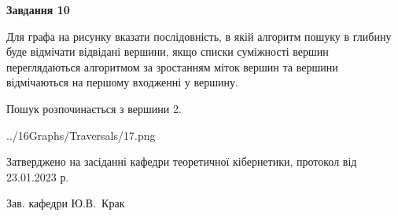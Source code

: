 \documentclass[12pt, ukrainian]{article}
\begin{document}
{\begin {large}
{\begin {center}\textbf{Завдання 10}\end {center}}\par
Для графа на рисунку вказати послідовність, в якій алгоритм пошуку в глибину буде відмічати відвідані вершини, якщо списки суміжності вершин переглядаються алгоритмом за зростанням міток вершин та вершини відмічаються на першому вход\-женні у вершину.\par
Пошук розпочинається з вершини 2.\par

\begin{center}
	{../16Graphs/Traversals/17.png}
\end{center}\par
\newpage


\end {large}
}
{\smallskip \begin {small} Затверджено на засіданні кафедри теоретичної кібернетики, протокол  від   23.01.2023 р.\par\smallskip\smallskip
{\parbox {6.5 cm}{Зав. кафедри \dotfill Ю.В.~Крак}} \end{small}}
\end{document}
